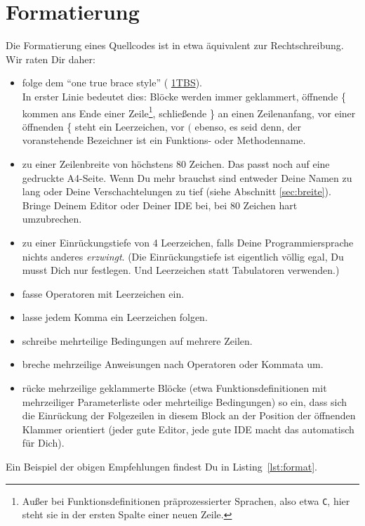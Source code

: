 \documentclass[twoside]{scrreprt}
\providecommand{\code}[1]{\texttt{#1}}
\begin{document}
\section{Formatierung\label{sec:format}}
Die Formatierung eines Quellcodes ist in etwa \"a{}quivalent zur
Rechtschreibung. Wir raten Dir daher:
\begin{itemize}
\item folge dem "`one true brace style"' (%
\href{http://en.wikipedia.org/wiki/Indent_style#Variant:_1TBS}{1TBS}).\\
  In erster Linie bedeutet dies: Bl\"o{}cke werden immer geklammert,
  \"o{}ffnende \{ kommen ans Ende einer
      Zeile\footnote{Au\ss{}er bei Funktionsdefinitionen pr\"a{}prozessierter
      Sprachen, also etwa \code{C}, hier steht sie in der ersten Spalte einer
  neuen Zeile.}, schlie\ss{}ende \} an einen Zeilenanfang,
      vor einer
  \"o{}ffnenden \{ steht ein Leerzeichen, vor $($ ebenso, es seid denn,
  der voranstehende Bezeichner ist ein Funktions- oder Methodenname.
\item zu einer Zeilenbreite von h\"o{}chstens 80 Zeichen. Das passt
  noch auf eine gedruckte A4-Seite. Wenn Du mehr brauchst sind
  entweder Deine Namen zu lang oder Deine Verschachtelungen zu
  tief (siehe Abschnitt \ref{sec:breite}).
  Bringe Deinem Editor oder Deiner IDE bei, bei 80 Zeichen hart
  umzubrechen.
\item zu einer Einr\"u{}ckungstiefe von 4 Leerzeichen, falls Deine
  Programmiersprache nichts anderes \emph{erzwingt}.
  (Die Einr\"u{}ckungstiefe ist eigentlich v\"o{}llig egal, Du
  musst Dich nur festlegen. Und Leerzeichen statt
  Tabulatoren verwenden.)
\item fasse Operatoren mit Leerzeichen ein.
\item lasse jedem Komma ein Leerzeichen folgen.
\item schreibe mehrteilige Bedingungen auf mehrere Zeilen.
\item breche mehrzeilige Anweisungen nach Operatoren oder Kommata um.
\item r\"u{}cke mehrzeilige geklammerte Bl\"o{}cke (etwa Funktionsdefinitionen
    mit mehrzeiliger Parameterliste oder mehrteilige Bedingungen) so ein, dass
    sich die Einr\"u{}ckung der Folgezeilen in diesem Block an der Position der
    \"o{}ffnenden Klammer orientiert (jeder gute Editor, jede gute IDE macht das
    automatisch f\"u{}r Dich).
\end{itemize}
Ein Beispiel der obigen Empfehlungen
findest Du in Listing~\ref{lst:format}.

\end{document}
